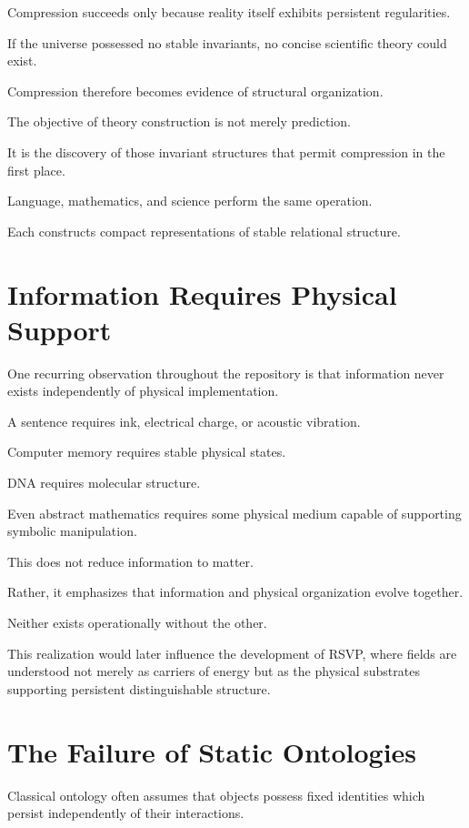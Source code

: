 \documentclass[11pt,oneside]{book}
\numberwithin{equation}{chapter}
\theoremstyle{definition}
\theoremstyle{plain}
\begin{document}
Compression succeeds only because reality itself exhibits persistent
regularities.

If the universe possessed no stable invariants, no concise scientific theory
could exist.

Compression therefore becomes evidence of structural organization.

The objective of theory construction is not merely prediction.

It is the discovery of those invariant structures that permit compression in
the first place.

Language, mathematics, and science perform the same operation.

Each constructs compact representations of stable relational structure.

\section{Information Requires Physical Support}

One recurring observation throughout the repository is that information
never exists independently of physical implementation.

A sentence requires ink, electrical charge, or acoustic vibration.

Computer memory requires stable physical states.

DNA requires molecular structure.

Even abstract mathematics requires some physical medium capable of
supporting symbolic manipulation.

This does not reduce information to matter.

Rather, it emphasizes that information and physical organization evolve
together.

Neither exists operationally without the other.

This realization would later influence the development of RSVP, where fields
are understood not merely as carriers of energy but as the physical
substrates supporting persistent distinguishable structure.

\section{The Failure of Static Ontologies}

Classical ontology often assumes that objects possess fixed identities which
persist independently of their interactions.
\end{document}
